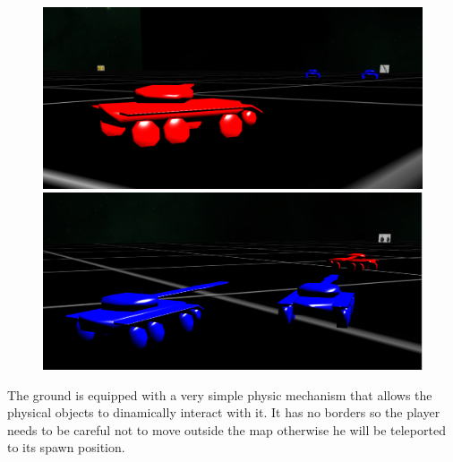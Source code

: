\documentclass[14pt]{article}
\begin{document}
\begin{figure}[H]
\begin{minipage}[t]{0.45\textwidth}
\center
\includegraphics[width=\textwidth]{images/scenario.png}
\end{minipage}
\hfill
\begin{minipage}[t]{0.45\textwidth}
\center
\includegraphics[width=\textwidth]{images/scenario2.png}
\end{minipage}
\label{img:scenario2}
\end{figure}
The ground is equipped with a very simple physic mechanism that allows the physical objects to dinamically interact with it. It has no borders so the player needs to be careful not to move outside the map otherwise he will be teleported to its spawn position.
\end{document}
